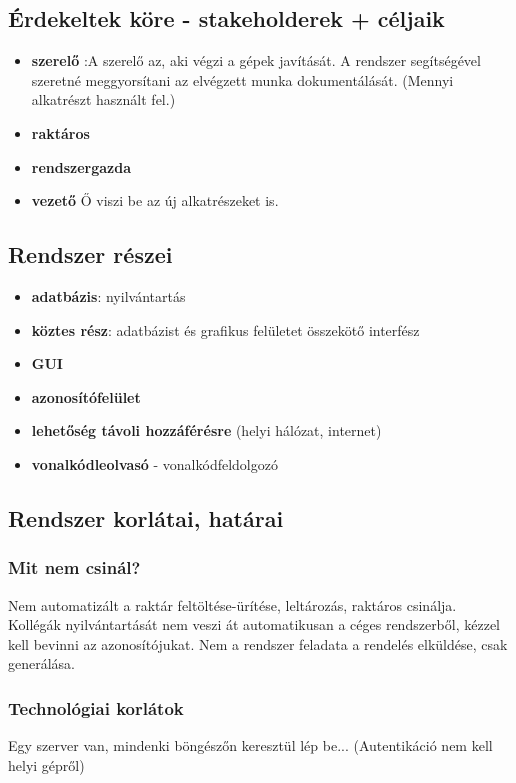\documentclass[11pt]{article}\usepackage[left=20mm,right=20mm,top=15mm,bottom=20mm]{geometry}
\begin{document}
\subsection{Érdekeltek köre - stakeholderek + céljaik}
\begin{itemize}
\item[] \textbf{szerelő} :A szerelő az, aki végzi a gépek javítását. A rendszer segítségével szeretné meggyorsítani az elvégzett munka dokumentálását. (Mennyi alkatrészt használt fel.)
\item[] \textbf{raktáros}
\item[] \textbf{rendszergazda}
\item[] \textbf{vezető} Ő viszi be az új alkatrészeket is.
\end{itemize}

\subsection{Rendszer részei}
\begin{itemize}
\item[] \textbf{adatbázis}: nyilvántartás
\item[] \textbf{köztes rész}: adatbázist és grafikus felületet összekötő interfész
\item[] \textbf{GUI}
\item[] \textbf{azonosítófelület}
\item[] \textbf{lehetőség távoli hozzáférésre} (helyi hálózat, internet)
\item[] \textbf{vonalkódleolvasó} - vonalkódfeldolgozó
\end{itemize}

\subsection{Rendszer korlátai, határai}
\subsubsection{Mit nem csinál?}
Nem automatizált a raktár feltöltése-ürítése, leltározás, raktáros csinálja.
Kollégák nyilvántartását nem veszi át automatikusan a céges rendszerből, kézzel kell bevinni az azonosítójukat.
Nem a rendszer feladata a rendelés elküldése, csak generálása.

\subsubsection{Technológiai korlátok}
Egy szerver van, mindenki böngészőn keresztül lép be...
(Autentikáció nem kell helyi gépről)
\end{document}
